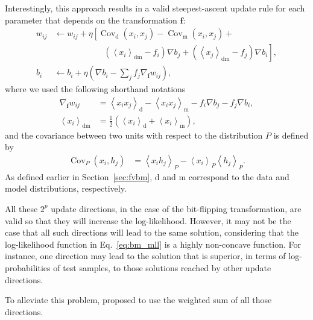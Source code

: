 \documentclass{now}
\newcommand{\qexp}[1]{\left<#1\right>}
\newcommand{\vect}[1]{\mathbf{#1}}
\newcommand{\cov}[0]{\operatorname{Cov}}
\newcommand{\vf}[0]{\vect{f}}
\newcommand{\td}[0]{\text{d}}
\newcommand{\tf}[0]{\text{m}}
\newcommand{\tdf}[0]{\text{dm}}
\begin{document}
Interestingly, this approach results in a valid steepest-ascent update rule for
each parameter that depends on the transformation $\vf$:
\begin{align}
  w_{ij} &\leftarrow  w_{ij} + \eta
  \left[\cov_\td(x_i,x_j)-\cov_\tf(x_i,x_j) + \right.
  \nonumber \\
  &\phantom{\leftarrow w_{ij} + \eta
  \left[\right]}\left.\left(\left<x_i\right>_\tdf-f_i\right)
  \nabla b_j + \left(\left<x_j\right>_\tdf-f_j\right) \nabla
  b_i \right], 
\label{eq:threestepW}
\\
 b_i &\leftarrow  b_i + \eta\left( \nabla b_i - \sum_j f_j \nabla_\vf
      w_{ij} \right),
\label{eq:threestepb}
\end{align}
where we used the following shorthand notations
\begin{align*}
\nabla_\vf w_{ij} &= \left<x_ix_j\right>_\td -
\left<x_ix_j\right>_\tf - f_i\nabla b_j - f_j \nabla b_i, \\
\left< x_i \right>_{\tdf} &= \frac{1}{2} \left( \left< x_i
\right>_{\td} + \left< x_i \right>_{\tf} \right),
\end{align*}
and the covariance between two units with respect to the distribution $P$ is
defined by
\begin{align*}
  \cov_P\left(x_i, h_j\right) &= \qexp{x_i h_j}_P
   -\qexp{x_i}_P \qexp{h_j}_P.
\end{align*}
As defined earlier in Section~\ref{sec:fvbm}, $\td$ and $\tf$ correspond to the
data and model distributions, respectively. 

All these $2^p$ update directions, in the case of the bit-flipping
transformation, are valid so that they will increase the log-likelihood.
However, it may not be the case that all such directions will lead to the same
solution, considering that the log-likelihood function in Eq.~\eqref{eq:bm_mll}
is a highly non-concave function. For instance, one direction may lead to the
solution that is superior, in terms of log-probabilities of test samples, to
those solutions reached by other update directions.

To alleviate this problem, \citet{Cho2013nc} proposed to use the weighted sum of
all those directions. 
\end{document}
